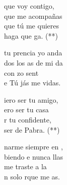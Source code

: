 \begin{cancion}%
	\begin{chorus}%
	 que voy contigo, \\
	 que me acompañas \\
	 que tú me quieres \\
	haga  que ga. (**)\\
	\end{chorus}%
	 tu prencia yo anda \\
	dos los as de mi da \\
	con zo sent\\
	e Tú jás me vidas.\\
	\begin{chorus}%
	iero ser tu amigo,\\
	ero ser tu casa\\
	r tu confidente,\\
	ser de  Pabra. (**)\\
	\end{chorus}%
	narme siempre en , \\
	biendo e nunca llas\\
	me traste a la \\
	n solo rque me as.\\
\end{cancion}%
